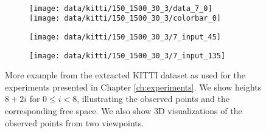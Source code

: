 \begin{figure}[h]
\begin{subfigure}[t]{0.2\textwidth}
  \end{subfigure}\\
  \begin{subfigure}[t]{0.425\textwidth}
    \vspace{12px}
    \texttt{[image: data/kitti/150\_1500\_30\_3/data\_7\_0]}\\
    \hspace*{-0.25cm}\texttt{[image: data/kitti/150\_1500\_30\_3/colorbar\_0]}
  \end{subfigure}
  \begin{subfigure}[t]{0.2\textwidth}
    \vspace{0px}
    \texttt{[image: data/kitti/150\_1500\_30\_3/7\_input\_45]}
  \end{subfigure}
  \begin{subfigure}[t]{0.2\textwidth}
    \vspace{0px}
    \texttt{[image: data/kitti/150\_1500\_30\_3/7\_input\_135]}
  \end{subfigure}
  
  \caption{More example from the extracted KITTI dataset as used for the experiments
  presented in Chapter \ref{ch:experiments}. We show heights $8 + 2i$ for $0 \leq i < 8$,
  illustrating the observed points and the corresponding free space. We also show 3D visualizations
  of the observed points from two viewpoints.}
  \label{fig:appendix-data-kitti-examples}
\end{figure}
